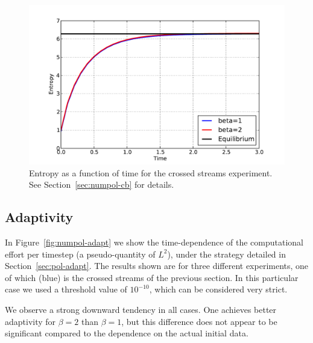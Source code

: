 \begin{figure}
    \centering
    \includegraphics[width=12cm]{figs/polboltz/scrossed-ent}
    \caption{Entropy as a function of time for the crossed streams experiment. See
    Section~\vref{sec:numpol-cb} for details.}
    \label{fig:numpol-cb-ent}
\end{figure}

\clearpage

\subsection{Adaptivity} \label{sec:numpol-adapt}

In Figure~\vref{fig:numpol-adapt} we show the time-dependence of the computational effort per timestep (a
pseudo-quantity of $L^2$), under the strategy detailed in Section~\vref{sec:pol-adapt}. The results shown are
for three different experiments, one of which (blue) is the crossed streams of the previous section. In this
particular case we used a threshold value of $10^{-10}$, which can be considered very strict.

We observe a strong downward tendency in all cases. One achieves better adaptivity for $\beta=2$ than
$\beta=1$, but this difference does not appear to be significant compared to the dependence on the actual
initial data.

